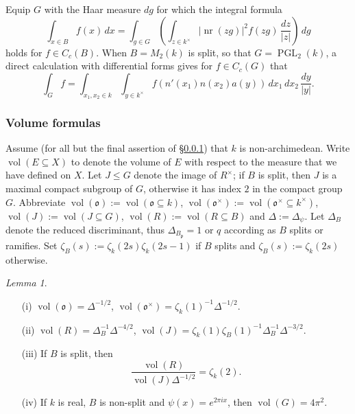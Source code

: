 \documentclass[reqno,10pt]{amsart}
\theoremstyle{plain} %
\theoremstyle{definition}
\theoremstyle{plain} %
\theoremstyle{remark}
\theoremstyle{itplain} %
\newtheorem*{lemma*}{Lemma}
\theoremstyle{remark} %
\renewcommand{\leq}{\leqslant}
\numberwithin{equation}{section}
\def\PGL{\operatorname{PGL}}
\DeclareMathOperator{\vol}{vol}
\DeclareMathOperator{\nr}{nr}
\begin{document}
Equip $G$ with the Haar measure $d g$ for which the integral formula
\begin{equation}\label{eq:integarl-formula-for-integrating-over-B}
  \int_{x \in B}
  f(x) \, d x
  = \int_{g \in G}
  \left(\int_{z \in k^\times}
  |\nr(z g)|^2 f(z g) \, \frac{d z}{|z|}\right) \, d g
\end{equation}
holds for $f \in C_c(B)$.  When $B = M_2(k)$ is split, so that $G = \PGL_2(k)$, a direct calculation with differential forms gives for $f \in C_c(G)$ that
\begin{equation}\label{eqn:explicit-M2-integral-formula}
  \int_G f
  =
  \int_{x_1,x_2 \in k}
  \int_{y \in k^\times}
  f(
  n'(x_1)
  n(x_2)
  a(y)
  )
  \, d x_1 \, d x_2 \, \frac{d y}{|y|}.
\end{equation}

\subsubsection{Volume formulas\label{sec:local-vol-formulas}}
\label{sec-2-1-3}
Assume (for all but the final assertion of \S\ref{sec-2-1-3}) that $k$ is non-archimedean.  Write $\vol(E \subseteq X)$ to denote the volume of $E$ with respect to the measure that we have defined on $X$.  Let $J \leq G$ denote the image of $R^\times$; if $B$ is split, then $J$ is a maximal compact subgroup of $G$, otherwise it has index $2$ in the compact group $G$.  Abbreviate $\vol(\mathfrak{o}) := \vol(\mathfrak{o} \subseteq k)$, $\vol(\mathfrak{o}^\times ) := \vol(\mathfrak{o}^\times \subseteq k^\times )$, $\vol(J) := \vol(J \subseteq G)$, $\vol(R) := \vol(R \subseteq B)$ and $\Delta := \Delta_{\psi}$.  Let $\Delta_{B}$ denote the reduced discriminant, thus $\Delta_{B_\mathfrak{p}} = 1$ or $q$ according as $B$ splits or ramifies.  Set $\zeta_B(s) := \zeta_k(2 s) \zeta_k(2 s - 1)$ if $B$ splits and $\zeta_B(s) := \zeta_k(2 s)$ otherwise.
\begin{lemma*}\label{lem:local-vol-formulas}
  ~\begin{enumerate}
  \item[(i)] $\vol(\mathfrak{o}) = \Delta^{-1/2}$, $\vol(\mathfrak{o}^\times) = \zeta_k(1)^{-1} \Delta^{-1/2}$.
  \item[(ii)] $\vol(R) = \Delta_B^{-1} \Delta^{-4/2}$, $\vol(J) = \zeta_k(1) \zeta_B(1)^{-1} \Delta_B^{-1} \Delta^{-3/2}$.
  \item[(iii)]
    If $B$ is split, then
    \[\frac{\vol(R)}{\vol(J) \Delta^{-1/2}}
      = \zeta_k(2).\]
  \item[(iv)] If $k$ is real, $B$ is non-split and $\psi(x) = e^{2 \pi i x}$, then $\vol(G) = 4 \pi^2$.
  \end{enumerate}
\end{lemma*}
\end{document}
